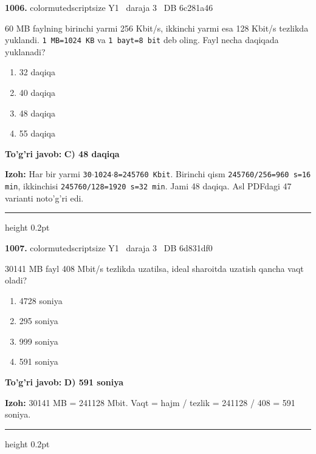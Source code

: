 \documentclass[10pt,a4paper,oneside]{article}
\begin{document}
\noindent\textbf{\color{ink}1006.}  {color{muted}scriptsize Y1 \textbullet\ daraja 3 \textbullet\ DB 6c281a46}
\par
60 MB faylning birinchi yarmi 256 Kbit/s, ikkinchi yarmi esa 128 Kbit/s tezlikda yuklandi. \texttt{1 MB=1024 KB} va \texttt{1 bayt=8 bit} deb oling. Fayl necha daqiqada yuklanadi?
\begin{enumerate}[label=\Alph*),leftmargin=9mm]
\item 32 daqiqa
\item 40 daqiqa
\item 48 daqiqa
\item 55 daqiqa
\end{enumerate}
\begin{tcolorbox}[enhanced,breakable,colback=teal!4,colframe=teal!50!black,boxrule=0.5pt,arc=1.1mm,left=3mm,right=3mm,top=1.7mm,bottom=1.7mm,before skip=2mm,after skip=2mm]
\textbf{\color{teal}To'g'ri javob:} \textbf{C) 48 daqiqa}
\par\smallskip
\textbf{Izoh:} Har bir yarmi \texttt{30\ensuremath{\cdot}1024\ensuremath{\cdot}8=245760 Kbit}. Birinchi qism \texttt{245760/256=960 s=16 min}, ikkinchisi \texttt{245760/128=1920 s=32 min}. Jami 48 daqiqa. Asl PDFdagi 47 varianti noto'g'ri edi.
\end{tcolorbox}
\vspace{2mm}\hrule height 0.2pt \vspace{3mm}

\noindent\textbf{\color{ink}1007.}  {color{muted}scriptsize Y1 \textbullet\ daraja 3 \textbullet\ DB 6d831df0}
\par
30141 MB fayl 408 Mbit/s tezlikda uzatilsa, ideal sharoitda uzatish qancha vaqt oladi?
\begin{enumerate}[label=\Alph*),leftmargin=9mm]
\item 4728 soniya
\item 295 soniya
\item 999 soniya
\item 591 soniya
\end{enumerate}
\begin{tcolorbox}[enhanced,breakable,colback=teal!4,colframe=teal!50!black,boxrule=0.5pt,arc=1.1mm,left=3mm,right=3mm,top=1.7mm,bottom=1.7mm,before skip=2mm,after skip=2mm]
\textbf{\color{teal}To'g'ri javob:} \textbf{D) 591 soniya}
\par\smallskip
\textbf{Izoh:} 30141 MB = 241128 Mbit. Vaqt = hajm / tezlik = 241128 / 408 = 591 soniya.
\end{tcolorbox}
\vspace{2mm}\hrule height 0.2pt \vspace{3mm}
\end{document}
